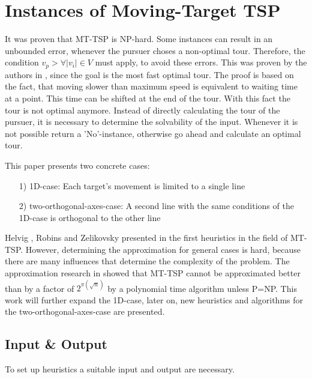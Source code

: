 \documentclass[english,version-2019-07]{uzl-thesis}
\begin{document}
\section{Instances of Moving-Target TSP}

It was proven that MT-TSP is NP-hard. Some instances can result in an unbounded error, whenever the pursuer choses a non-optimal tour. Therefore, the condition $v_p > \forall \vert v_i\vert \in V$ must apply, to avoid these errors. This was proven by the authors in \cite{helvig}, since the goal is the most fast optimal tour. The proof is based on the fact, that moving slower than maximum speed is equivalent to waiting time at a point. This time can be shifted at the end of the tour. With this fact the tour is not optimal anymore.
Instead of directly calculating the tour of the pursuer, it is necessary to determine the solvability of the input. Whenever it is not possible return a 'No'-instance, otherwise go ahead and calculate an optimal tour. 

This paper presents two concrete cases:
\begin{itemize}
\item[1)]
1D-case: 
Each target's movement is limited to a single line 

\item[2)]
two-orthogonal-axes-case:
A second line with the same conditions of the 1D-case is orthogonal to the other line

\end{itemize}

Helvig , Robins and Zelikovsky presented in \cite{helvig} the first heuristics in the field of MT-TSP. However, determining the approximation for general cases is hard, because there are many influences that determine the complexity of the problem. The approximation research in \cite{hammar} showed that MT-TSP cannot be approximated better than by a factor of $2^{\pi (\sqrt{n})}$ by a polynomial time algorithm unless P=NP. 
This work will further expand the 1D-case, later on, new heuristics and algorithms for the two-orthogonal-axes-case are presented. 

\subsection{Input \& Output}
To set up heuristics a suitable input and output are necessary. 
\end{document}
